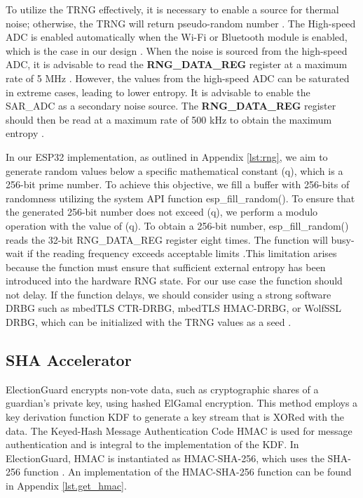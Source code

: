 To utilize the \ac{TRNG} effectively, it is necessary to enable a source for thermal noise; otherwise, the \ac{TRNG} will return pseudo-random number \cite[609]{esp32-ref}. The High-speed ADC is enabled automatically when the Wi-Fi or Bluetooth module is enabled, which is the case in our design \cite[610]{esp32-ref}. When the noise is sourced from the high-speed ADC, it is advisable to read the \textbf{RNG\_DATA\_REG} register at a maximum rate of 5 MHz \cite[609]{esp32-ref}. However, the values from the high-speed ADC can be saturated in extreme cases, leading to lower entropy. It is advisable to enable the SAR\_ADC as a secondary noise source. The \textbf{RNG\_DATA\_REG} register should then be read at a maximum rate of 500 kHz to obtain the maximum entropy \cite[609]{esp32-ref}.

In our ESP32 implementation, as outlined in Appendix \ref{lst:rng}, we aim to generate random values below a specific mathematical constant (q), which is a 256-bit prime number. To achieve this objective, we fill a buffer with 256-bits of randomness utilizing the system API function esp\_fill\_random(). To ensure that the generated 256-bit number does not exceed (q), we perform a modulo operation with the value of (q). To obtain a 256-bit number, esp\_fill\_random() reads the 32-bit RNG\_DATA\_REG register eight times. The function will busy-wait if the reading frequency exceeds acceptable limits \cite{esp32-ref}.This limitation arises because the function must ensure that sufficient external entropy has been introduced into the hardware RNG state. For our use case the function should not delay. If the function delays, we should consider using a strong software \ac{DRBG} such as mbedTLS CTR-DRBG, mbedTLS HMAC-DRBG, or WolfSSL DRBG, which can be initialized with the TRNG values as a seed \cite{esp32-ref} \cite[588]{wolfSSL-manual}.



\subsection{\ac{SHA} Accelerator}
ElectionGuard encrypts non-vote data, such as cryptographic shares of a guardian’s private key, using hashed ElGamal encryption. This method employs a key derivation function \ac{KDF} to generate a key stream that is XORed with the data. The Keyed-Hash Message Authentication Code \ac{HMAC} is used for message authentication and is integral to the implementation of the \ac{KDF}. In ElectionGuard, HMAC is instantiated as HMAC-SHA-256, which uses the SHA-256 function \cite[7]{eg-spec}. An implementation of the HMAC-SHA-256 function can be found in Appendix \ref{lst.get_hmac}. 

